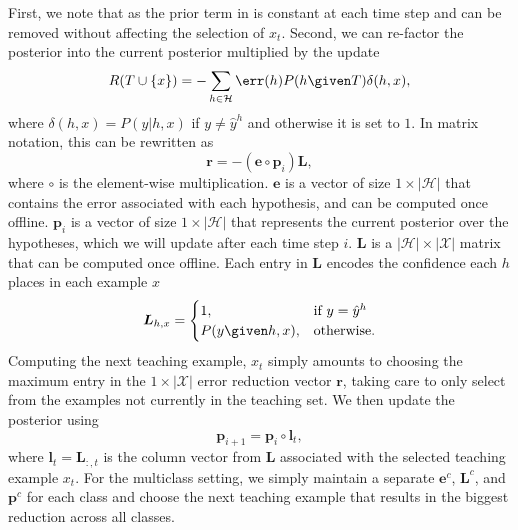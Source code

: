 \documentclass[../main.tex]{subfiles}
\begin{document}
First, we note that as the prior term in  is constant at each time step and can be removed without affecting the selection of $x_{t}$.
Second, we can re-factor the posterior into the current posterior multiplied by the update
\begin{equation}
R(T \cup \{x\}) = - \sum \limits_{h \in \mathcal{H}}\err(h) P(h\given T) \delta(h, x),
\end{equation}
where $\delta(h, x) = P(y|h, x)$ if $y \neq \hat{y}^h$ and otherwise it is set to $1$.
In matrix notation, this can be rewritten as 
\begin{equation}
\boldsymbol{r} = -(\boldsymbol{e}\circ\boldsymbol{p}_i) \boldsymbol{L},
\end{equation}
where $\circ$ is the element-wise multiplication.
$\boldsymbol{e}$ is a vector of size $1\times |\mathcal{H}|$ that contains the error associated with each hypothesis, and can be computed once offline.
$\boldsymbol{p}_i$ is a vector of size $1\times |\mathcal{H}|$ that represents the current posterior over the  hypotheses, which we will update after each time step $i$.
$\boldsymbol{L}$ is a $|\mathcal{H}|\times |\mathcal{X}|$ matrix that can be computed once offline. 
Each entry in $\boldsymbol{L}$ encodes the confidence each $h$ places in each example $x$ 
\begin{equation}
\boldsymbol{L}_{h,x} =
\begin{cases}
  1, & \text{if}\ y = \hat{y}^h \\
  P(y\given h, x), & \text{otherwise}.
\end{cases}
\end{equation}
Computing the next teaching example, $x_t$ simply amounts to choosing the maximum entry in the $1\times |\mathcal{X}|$ error reduction vector $\boldsymbol{r}$, taking care to only select from the examples not currently in the teaching set. 
We then update the posterior using 
\begin{equation}
\boldsymbol{p}_{i+1} = \boldsymbol{p}_i \circ \boldsymbol{l}_{t}, 
\end{equation}
where $\boldsymbol{l}_{t} = \boldsymbol{L}_{:, t}$ is the column vector from $\boldsymbol{L}$ associated with the selected teaching example $x_t$.
For the multiclass setting, we simply maintain a separate $\boldsymbol{e}^c$, $\boldsymbol{L}^c$, and $\boldsymbol{p}^c$ for each class and choose the next teaching example that results in the biggest reduction across all classes.
\end{document}

